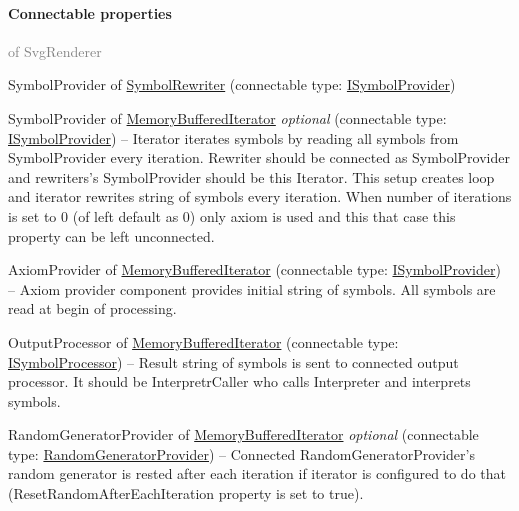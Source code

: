 	\paragraph{Connectable properties}\textcolor{gray}{of SvgRenderer}
	\begin{description*}
		\item[SymbolProvider] of \hyperref[Malsys.Processing.Components.Rewriters.SymbolRewriter]{SymbolRewriter}
		(connectable type: \hyperref[Malsys.Processing.Components.ISymbolProvider]{ISymbolProvider})
		\item[SymbolProvider] of \hyperref[Malsys.Processing.Components.RewriterIterators.MemoryBufferedIterator]{MemoryBufferedIterator}
 \textit{optional} 		(connectable type: \hyperref[Malsys.Processing.Components.ISymbolProvider]{ISymbolProvider})
			-- Iterator iterates symbols by reading all symbols from SymbolProvider every iteration.
            Rewriter should be connected as SymbolProvider and rewriters's SymbolProvider should be this Iterator.
            This setup creates loop and iterator rewrites string of symbols every iteration.
            When number of iterations is set to 0 (of left default as 0) only axiom is used and this that case this property can be left unconnected.
		\item[AxiomProvider] of \hyperref[Malsys.Processing.Components.RewriterIterators.MemoryBufferedIterator]{MemoryBufferedIterator}
		(connectable type: \hyperref[Malsys.Processing.Components.ISymbolProvider]{ISymbolProvider})
			-- Axiom provider component provides initial string of symbols.
            All symbols are read at begin of processing.
		\item[OutputProcessor] of \hyperref[Malsys.Processing.Components.RewriterIterators.MemoryBufferedIterator]{MemoryBufferedIterator}
		(connectable type: \hyperref[Malsys.Processing.Components.ISymbolProcessor]{ISymbolProcessor})
			-- Result string of symbols is sent to connected output processor.
            It should be InterpretrCaller who calls Interpreter and interprets symbols.
		\item[RandomGeneratorProvider] of \hyperref[Malsys.Processing.Components.RewriterIterators.MemoryBufferedIterator]{MemoryBufferedIterator}
 \textit{optional} 		(connectable type: \hyperref[Malsys.Processing.Components.Common.RandomGeneratorProvider]{RandomGeneratorProvider})
			-- Connected RandomGeneratorProvider's random generator is rested after each iteration
            if iterator is configured to do that (ResetRandomAfterEachIteration property is set to true).

\end{description*}
